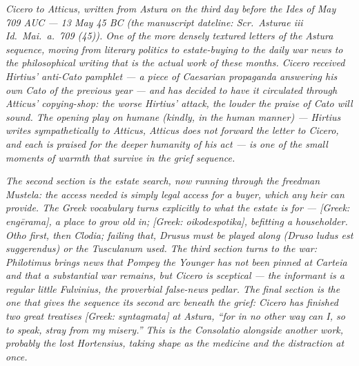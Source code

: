 
\textit{Cicero to Atticus, written from Astura on the
third day before the Ides of May 709 AUC --- 13 May
45 BC (the manuscript dateline: \textit{Scr.\ Asturae
iii Id.\ Mai.\ a.\ 709 (45)}). One of the more
densely textured letters of the Astura sequence,
moving from literary politics to estate-buying to
the daily war news to the philosophical writing that
is the actual work of these months. Cicero received
Hirtius' anti-Cato pamphlet --- a piece of Caesarian
propaganda answering his own \textit{Cato} of the
previous year --- and has decided to have it
circulated through Atticus' copying-shop: the worse
Hirtius' attack, the louder the praise of Cato will
sound. The opening play on \textit{humane} (kindly,
in the human manner) --- Hirtius writes sympathetically
to Atticus, Atticus does not forward the letter to
Cicero, and each is praised for the deeper humanity
of his act --- is one of the small moments of
warmth that survive in the grief sequence.}

\textit{The second section is the estate search, now
running through the freedman Mustela: the access
needed is simply legal access for a buyer, which any
heir can provide. The Greek vocabulary turns
explicitly to what the estate is for ---
\textit{[Greek: eng\=erama]}, a place to grow old in;
\textit{[Greek: oikodespotika]}, befitting a
householder. Otho first, then Clodia; failing that,
Drusus must be played along (\textit{Druso ludus est
suggerendus}) or the Tusculanum used. The third
section turns to the war: Philotimus brings news
that Pompey the Younger has not been pinned at
Carteia and that a substantial war remains, but
Cicero is sceptical --- the informant is a regular
little Fulvinius, the proverbial false-news pedlar.
The final section is the one that gives the sequence
its second arc beneath the grief: Cicero has
finished two great treatises \textit{[Greek:
syntagmata]} at Astura, ``for in no other way can
I, so to speak, stray from my misery.'' This is
the \textit{Consolatio} alongside another work,
probably the lost \textit{Hortensius}, taking shape
as the medicine and the distraction at once.}
